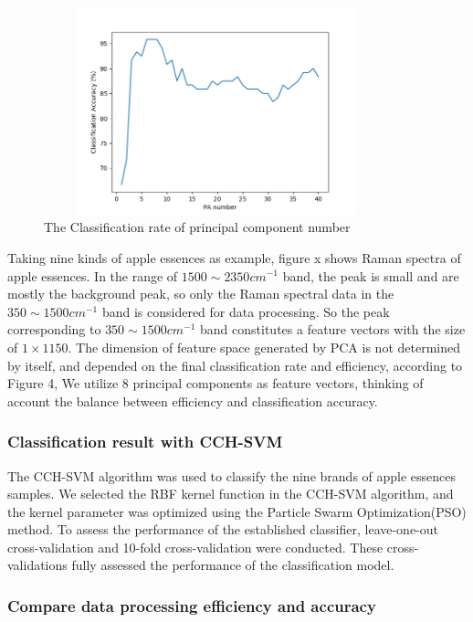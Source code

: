 \documentclass[a4paper]{article}
\begin{document}
    \begin{figure}[h]
  \centering
  \includegraphics[width=10cm,height=6cm]{Figure_3}
  \caption{ The Classification rate of principal component number }
\end{figure}
Taking nine kinds of apple essences as example, figure x shows Raman spectra of apple essences. In the range of $1500 \sim  2350 cm^{-1}$ band, the peak is small and are mostly the background peak, so only the Raman spectral data in the $350 \sim 1500 cm^{-1}$ band is considered for data processing. So the peak corresponding to $ 350 \sim 1500 cm^{-1}$ band constitutes a feature vectors with the size of $ 1\times 1150 $.
The dimension of feature space generated by PCA is not determined by itself, and depended on the final classification rate and efficiency, according to Figure 4, We utilize 8 principal components as feature vectors, thinking of account the balance between efficiency and classification accuracy.

    \subsubsection{Classification result with CCH-SVM}

The CCH-SVM algorithm was used to classify the nine brands of apple essences samples. We selected the RBF kernel function in the CCH-SVM algorithm, and the kernel parameter was optimized using the Particle Swarm Optimization(PSO) method. To assess the performance of the established classifier, leave-one-out cross-validation and 10-fold cross-validation were conducted. These cross-validations fully assessed the performance of the classification model.




    \subsubsection{Compare data processing efficiency and accuracy}
\end{document}
